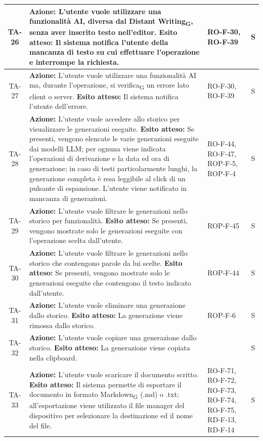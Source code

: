 \documentclass[11pt,a4paper]{article}
\newcommand{\gls}[1]{#1\textsubscript{G}}
\begin{document}
\begin{longtable}{|c|p{9cm}|p{3cm}|c|}
\hline
TA-26 & \textbf{Azione:} L'utente vuole utilizzare una funzionalità AI, diversa dal \gls{Distant Writing}, senza aver inserito testo nell'editor. \newline \textbf{Esito atteso:} Il sistema notifica l'utente della mancanza di testo su cui effettuare l'operazione e interrompe la richiesta. & RO-F-30, RO-F-39  & S \\
\hline
TA-27 & \textbf{Azione:} L'utente vuole utilizzare una funzionalità AI ma, durante l'operazione, si \gls{verifica} un errore lato client o server. \newline \textbf{Esito atteso:} Il sistema notifica l'utente dell'errore. & RO-F-30, RO-F-39  & S \\
\hline
TA-28 & \textbf{Azione:} L'utente vuole accedere allo storico per visualizzare le generazioni eseguite. \newline \textbf{Esito atteso:} Se presenti, vengono elencate le varie generazioni eseguite dai modelli LLM; per ognuna viene indicata l'operazioni di derivazione e la data ed ora di generazione; in caso di testi particolarmente lunghi, la generazione completa è resa leggibile al click di un pulsante di espansione. L'utente viene notificato in mancanza di generazioni. & RO-F-44, RO-F-47, ROP-F-5, ROP-F-4  & S \\
\hline
TA-29 & \textbf{Azione:} L'utente vuole filtrare le generazioni nello storico per funzionalità. \newline \textbf{Esito atteso:} Se presenti, vengono mostrate solo le generazioni eseguite con l'operazione scelta dall'utente. & ROP-F-45 & S \\
\hline
TA-30 & \textbf{Azione:} L'utente vuole filtrare le generazioni nello storico che contengono parole da lui scelte. \newline \textbf{Esito atteso:} Se presenti, vengono mostrate solo le generazioni eseguite che contengono il testo indicato dall'utente. & ROP-F-44 & S \\
\hline
TA-31 & \textbf{Azione:} L'utente vuole eliminare una generazione dallo storico. \newline \textbf{Esito atteso:} La generazione viene rimossa dallo storico. & ROP-F-6 & S \\
\hline
TA-32 & \textbf{Azione:} L'utente vuole copiare una generazione dallo storico. \newline \textbf{Esito atteso:} La generazione viene copiata nella clipboard. &  & S \\
\hline
TA-33 & \textbf{Azione:} L'utente vuole scaricare il documento scritto. \newline \textbf{Esito atteso:} Il sistema permette di esportare il documento in formato \gls{Markdown} (.md) o .txt; all'esportazione viene utilizzato il file manager del dispositivo per selezionare la destinazione ed il nome del file. & RO-F-71, RO-F-72, RO-F-73, RO-F-74, RO-F-75, RD-F-13, RD-F-14 & S \\

\end{longtable}
\end{document}
